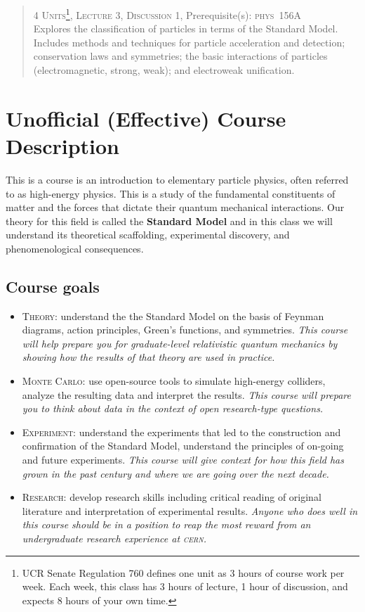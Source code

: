 \documentclass[12pt]{article}
\newcommand{\acro}[1]{\textsc{\MakeLowercase{#1}}}
\numberwithin{equation}{section}    %
\begin{document}
\begin{quote}
\textsc{4 Units\footnote{UCR Senate Regulation 760 defines one unit as 3 hours of course work per week. Each week, this class has 3 hours of lecture, 1 hour of discussion, and expects 8 hours of your own time.}, Lecture 3, Discussion 1}, Prerequisite(s): \acro{phys}~156A
\\	Explores the classification of particles in terms of the Standard Model. Includes methods and techniques for particle acceleration and detection; conservation laws and symmetries; the basic interactions of particles (electromagnetic, strong, weak); and electroweak unification.
	
\end{quote}


\section*{Unofficial (Effective) Course Description}

This is a course is an introduction to  elementary particle physics, often referred to as high-energy physics. This is a study of the fundamental constituents of matter and the forces that dictate their quantum mechanical interactions. Our theory for this field is called the \textbf{Standard Model} and in this class we will understand its theoretical scaffolding, experimental discovery, and phenomenological consequences.

\subsection*{Course goals}
\begin{itemize}
	\item \textsc{Theory:} understand the the Standard Model on the basis of Feynman diagrams, action principles, Green's functions, and symmetries. \emph{This course will help prepare you for graduate-level relativistic quantum mechanics by showing how the results of that theory are used in practice.}
	\item \textsc{Monte Carlo:} use open-source tools to simulate high-energy colliders, analyze the resulting data and interpret the results. \emph{This course will prepare you to think about data in the context of open research-type questions.}
	\item \textsc{Experiment:} understand the experiments that led to the construction and confirmation of the Standard Model, understand the principles of on-going and future experiments. \emph{This course will give context for how this field has grown in the past century and where we are going over the next decade.}
	\item \textsc{Research:} develop research skills including critical reading of original literature and interpretation of experimental results. \emph{Anyone who does well in this course should be in a position to reap the most reward from an undergraduate research experience at \acro{CERN}.}
\end{itemize}
\end{document}
